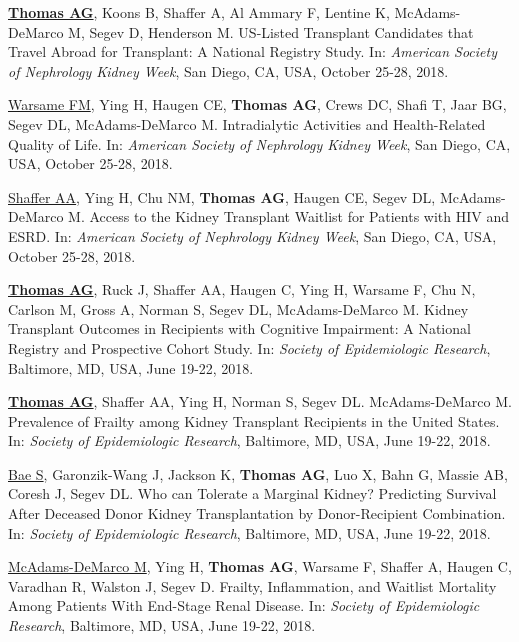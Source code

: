 \documentclass[10pt]{article}
\makeatletter
\newlength{\bibhang}
\newlength{\bibsep}
 {\@listi \global\bibsep\itemsep \global\advance\bibsep by\parsep}
\newenvironment{bibenum*}
  {\renewcommand\labelenumi{[\theenumi]}%
   \etaremune[
     topsep=0pt,
     itemsep=\bibsep,
     parsep=0pt,partopsep=0pt,
     itemindent=-\bibhang,
     leftmargin={\bibhang+\widthof{[999]}}]}
  {\endetaremune}
\makeatother
\begin{document}
\begin{bibenum*}

\item \underline{\textbf{Thomas AG}}, Koons B, Shaffer A, Al Ammary F,
  Lentine K, McAdams-DeMarco M, Segev D, Henderson M.
  US-Listed Transplant Candidates that Travel Abroad for Transplant:
  A National Registry Study.
  In: \emph{American Society of Nephrology Kidney Week},
  San Diego, CA, USA, October 25-28, 2018.

\item \underline{Warsame FM}, Ying H, Haugen CE, \textbf{Thomas AG},
  Crews DC, Shafi T, Jaar BG, Segev DL, McAdams-DeMarco M.
  Intradialytic Activities and Health-Related Quality of Life.
  In: \emph{American Society of Nephrology Kidney Week},
  San Diego, CA, USA, October 25-28, 2018.

\item \underline{Shaffer AA}, Ying H, Chu NM, \textbf{Thomas AG},
  Haugen CE, Segev DL, McAdams-DeMarco M.
  Access to the Kidney Transplant Waitlist for Patients with HIV and ESRD.
  In: \emph{American Society of Nephrology Kidney Week},
  San Diego, CA, USA, October 25-28, 2018.

\item \underline{\textbf{Thomas AG}}, Ruck J, Shaffer AA, Haugen C,
  Ying H, Warsame F, Chu N, Carlson M, Gross A, Norman S, Segev DL,
  McAdams-DeMarco M.
  Kidney Transplant Outcomes in Recipients with Cognitive Impairment:
  A National Registry and Prospective Cohort Study.
  In: \emph{Society of Epidemiologic Research},
  Baltimore, MD, USA, June 19-22, 2018.

\item \underline{\textbf{Thomas AG}}, Shaffer AA, Ying H, Norman S,
  Segev DL. McAdams-DeMarco M.
  Prevalence of Frailty among Kidney Transplant Recipients in the United States.
  In: \emph{Society of Epidemiologic Research},
  Baltimore, MD, USA, June 19-22, 2018.

\item \underline{Bae S}, Garonzik-Wang J, Jackson K, \textbf{Thomas AG},
  Luo X, Bahn G, Massie AB, Coresh J, Segev DL.
  Who can Tolerate a Marginal Kidney? Predicting Survival After Deceased
  Donor Kidney Transplantation by Donor-Recipient Combination.
  In: \emph{Society of Epidemiologic Research},
  Baltimore, MD, USA, June 19-22, 2018.

\item \underline{McAdams-DeMarco M}, Ying H, \textbf{Thomas AG}, Warsame F,
  Shaffer A, Haugen C, Varadhan R, Walston J, Segev D.
  Frailty, Inflammation, and Waitlist Mortality Among Patients
  With End-Stage Renal Disease.
  In: \emph{Society of Epidemiologic Research},
  Baltimore, MD, USA, June 19-22, 2018.


\end{bibenum*}
\end{document}
